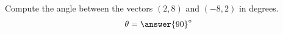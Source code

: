 \begin{problem}
Compute the angle between the vectors $(2,8)$ and $(-8,2)$ in degrees.
\[
\theta = \answer{90}^\circ
\]
\end{problem}
